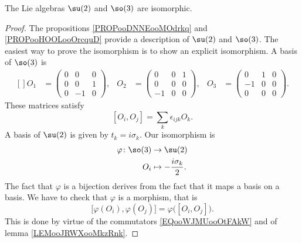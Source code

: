 \begin{proposition}
	The Lie algebras \( \su(2)\) and \( \so(3)\) are isomorphic.
\end{proposition}

\begin{proof}
	The propositions \ref{PROPooDNNEooMOdrkq} and \ref{PROPooHOOLooOrcquD} provide a description of \( \su(2)\) and \( \so(3)\). The easiest way to prove the isomorphism is to show an explicit isomorphism. A basis of \( \so(3)\) is
	\begin{equation}
		\begin{aligned}[]
			O_1 & =\begin{pmatrix}
				       0 & 0  & 0 \\
				       0 & 0  & 1 \\
				       0 & -1 & 0
			       \end{pmatrix}, & O_2 & =\begin{pmatrix}
				                               0  & 0 & 1 \\
				                               0  & 0 & 0 \\
				                               -1 & 0 & 0
			                               \end{pmatrix}, & O_3 & =\begin{pmatrix}
				                                                       0  & 1 & 0 \\
				                                                       -1 & 0 & 0 \\
				                                                       0  & 0 & 0
			                                                       \end{pmatrix}.
		\end{aligned}
	\end{equation}
	These matrices satisfy
	\begin{equation}        \label{EQooWJMUooOtFAkW}
		[O_i,O_j]=\sum_k\epsilon_{ijk}O_k.
	\end{equation}
	A basis of \( \su(2)\) is given by \( t_k=i\sigma_k\). Our isomorphism is
	\begin{equation}
		\begin{aligned}
			\varphi\colon \so(3) & \to \su(2)                        \\
			O_i                  & \mapsto -\frac{ i\sigma_k }{ 2 }.
		\end{aligned}
	\end{equation}
	The fact that \( \varphi\) is a bijection derives from the fact that it maps a basis on a basis. We have to check that \( \varphi\) is a morphism, that is
	\begin{equation}
		\big[ \varphi(O_i),\varphi(O_j) \big]=\varphi\big( [O_i,O_j] \big).
	\end{equation}
	This is done by virtue of the commutators \eqref{EQooWJMUooOtFAkW} and of lemma \ref{LEMooJRWXooMkzRnk}.
\end{proof}

